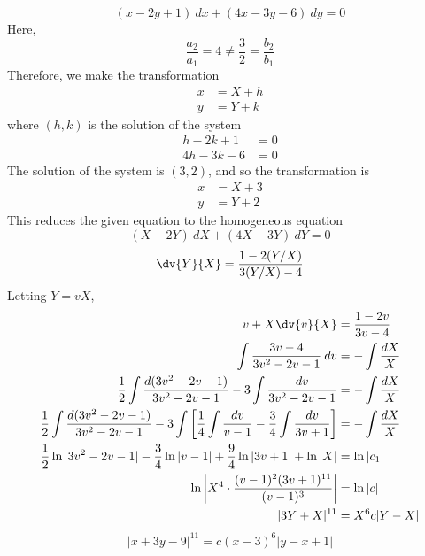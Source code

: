 \begin{example}{\[
        (x - 2y + 1) \: d{x} + (4x - 3y - 6) \: d{y} = 0
\]}{} \vspace{-20pt}
    Here, \[
        \frac{a_2}{a_1} = 4 \neq \frac{3}{2} = \frac{b_2}{b_1}
    \] Therefore, we make the transformation
    \begin{align*}
        x &= X + h \\
        y &= Y + k
    \end{align*}
    where $(h,k)$ is the solution of the system
    \begin{align*}
        h - 2k + 1 &= 0 \\
        4h - 3k - 6 &= 0
    \end{align*}
    The solution of the system is $(3,2)$, and so the transformation is
    \begin{align*}
        x &= X + 3 \\
        y &= Y + 2
    \end{align*}
    This reduces the given equation to the homogeneous equation
    \[ (X-2Y) \: d{X} + (4X-3Y) \: d{Y} = 0 \]
    \[ \dv{Y}{X} = \frac{1 - 2(Y/X)}{3(Y/X) - 4} \]
    Letting $Y = vX$,
    \begin{align*}
        v + X\dv{v}{X} &= \frac{1-2v}{3v-4} \\
        \int{ \frac{3v-4}{3v^2-2v-1} } \: d{v} &= -\int{ \frac{dX}{X} } \\
        \frac{1}{2}\int{ \frac{d(3v^2-2v-1)}{3v^2-2v-1} } - 3\int{ \frac{dv}{3v^2-2v-1} } &= -\int{ \frac{dX}{X} } \\
        \frac{1}{2}\int{ \frac{d(3v^2-2v-1)}{3v^2-2v-1} } - 3\int{ \left[ \frac{1}{4}\int{ \frac{dv}{v-1} } - \frac{3}{4}\int{ \frac{dv}{3v+1} } \right]  } &= -\int{ \frac{dX}{X} } \\
        \frac{1}{2}\ln|3v^2-2v-1| - \frac{3}{4}\ln|v-1| + \frac{9}{4}\ln|3v+1| + \ln|X| &= \ln|c_1| \\
        \ln \left| X^4 \cdot \frac{(v-1)^2(3v+1)^{11}}{(v-1)^3} \right| &= \ln|c| \\
        |3Y+X|^{11} &= X^6c|Y-X|
    \end{align*}
    \[ \boxed{ |x + 3y - 9|^{11} = c(x-3)^6|y-x+1| } \]
\end{example}

